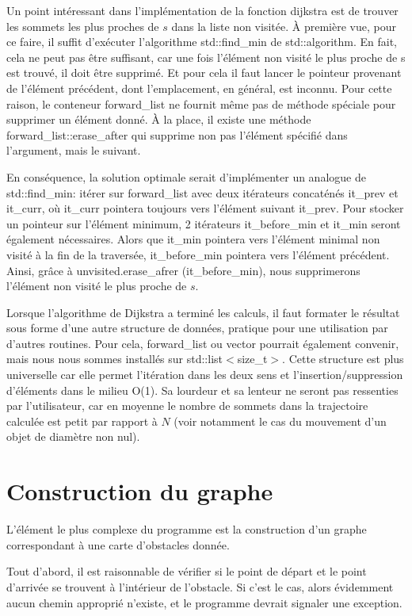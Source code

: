 \documentclass[12pt]{article}
\begin{document}
	Un point intéressant dans l'implémentation de la fonction dijkstra est de trouver les sommets les plus proches de $s$ dans la liste non visitée. À première vue, pour ce faire, il suffit d'exécuter l'algorithme std::find\_min de std::algorithm. En fait, cela ne peut pas être suffisant, car une fois l'élément non visité le plus proche de s est trouvé, il doit être supprimé. Et pour cela il faut lancer le pointeur provenant de l'élément précédent, dont l'emplacement, en général, est inconnu. Pour cette raison, le conteneur forward\_list ne fournit même pas de méthode spéciale pour supprimer un élément donné. À la place, il existe une méthode forward\_list::erase\_after qui supprime non pas l'élément spécifié dans l'argument, mais le suivant.
	
	En conséquence, la solution optimale serait d'implémenter un analogue de std::find\_min: itérer sur forward\_list avec deux itérateurs concaténés it\_prev et it\_curr, où it\_curr pointera toujours vers l'élément suivant it\_prev. Pour stocker un pointeur sur l'élément minimum, 2 itérateurs it\_before\_min et it\_min seront également nécessaires. Alors que it\_min pointera vers l'élément minimal non visité à la fin de la traversée, it\_before\_min pointera vers l'élément précédent. Ainsi, grâce à unvisited.erase\_afrer (it\_before\_min), nous supprimerons l'élément non visité le plus proche de $s$.
	
	Lorsque l'algorithme de Dijkstra a terminé les calculs, il faut formater le résultat sous forme d'une autre structure de données, pratique pour une utilisation par d'autres routines. Pour cela, forward\_list ou vector pourrait également convenir, mais nous nous sommes installés sur std::list$<$size\_t$>$. Cette structure est plus universelle car elle permet l'itération dans les deux sens et l'insertion/suppression d'éléments dans le milieu O(1). Sa lourdeur et sa lenteur ne seront pas ressenties par l'utilisateur, car en moyenne le nombre de sommets dans la trajectoire calculée est petit par rapport à $N$ (voir notamment le cas du mouvement d'un objet de diamètre non nul).
	
	\section{Construction du graphe}
	
	L'élément le plus complexe du programme est la construction d'un graphe correspondant à une carte d'obstacles donnée.
	
	Tout d'abord, il est raisonnable de vérifier si le point de départ et le point d'arrivée se trouvent à l'intérieur de l'obstacle. Si c'est le cas, alors évidemment aucun chemin approprié n'existe, et le programme devrait signaler une exception.
	
\end{document}
